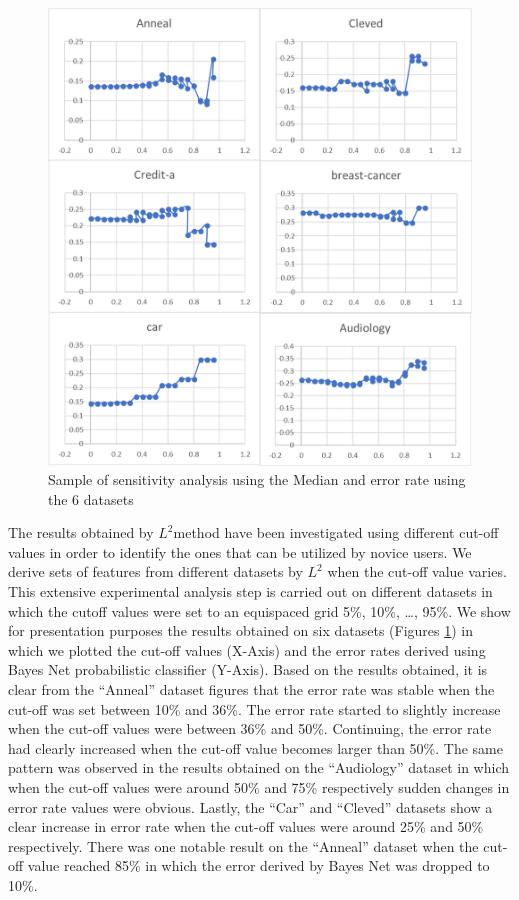 \documentclass[review]{elsarticle}
\begin{document}
\begin{figure}[h]
	\centering
	\includegraphics[width=0.9\linewidth]{figs/fig_2}
	\caption[short fig2 results]{Sample of sensitivity analysis using the Median and error rate using the 6 datasets}
	\label{fig:fig2}
\end{figure}

The results obtained by $ L^2  $method have been investigated using different cut-off values in order to identify the ones that can be utilized by novice users. We derive sets of features from different datasets by $ L^2 $ when the cut-off value varies. This extensive experimental analysis step is carried out on different datasets in which the cutoff values were set to an equispaced grid {5\%, 10\%, …, 95\%}. We show for presentation purposes the results obtained on six datasets (Figures \ref{fig:fig2}) in which we plotted the cut-off values (X-Axis) and the error rates derived using Bayes Net probabilistic classifier (Y-Axis). Based on the results obtained, it is clear from the “Anneal” dataset figures that the error rate was stable when the cut-off was set between 10\% and 36\%. The error rate started to slightly increase when the cut-off values were between 36\% and 50\%. Continuing, the error rate had clearly increased when the cut-off value becomes larger than 50\%. The same pattern was observed in the results obtained on the “Audiology” dataset in which when the cut-off values were around 50\% and 75\% respectively sudden changes in error rate values were obvious. Lastly, the “Car” and “Cleved” datasets show a clear increase in error rate when the cut-off values were around 25\% and 50\% respectively. There was one notable result on the “Anneal” dataset when the cut-off value reached 85\% in which  the error derived by Bayes Net was dropped to 10\%. 
\end{document}
